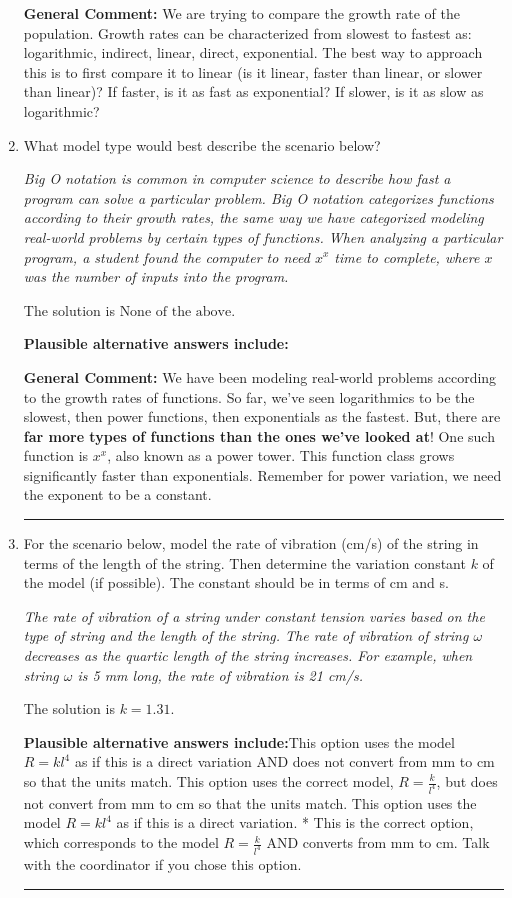 \documentclass{extbook}[14pt]
\newcommand{\litem}[1]{\item #1

\rule{\textwidth}{0.4pt}}
\begin{document}
\begin{enumerate}
{\textbf{General Comment:} We are trying to compare the growth rate of the population. Growth rates can be characterized from slowest to fastest as: logarithmic, indirect, linear, direct, exponential. The best way to approach this is to first compare it to linear (is it linear, faster than linear, or slower than linear)? If faster, is it as fast as exponential? If slower, is it as slow as logarithmic?
}
\litem{
What model type would best describe the scenario below?

\begin{center}
    \textit{ Big O notation is common in computer science to describe how fast a program can solve a particular problem. Big O notation categorizes functions according to their growth rates, the same way we have categorized modeling real-world problems by certain types of functions. When analyzing a particular program, a student found the computer to need $x^x$ time to complete, where $x$ was the number of inputs into the program. }
\end{center}
The solution is \( \text{None of the above} \).\begin{enumerate}[label=\Alph*.]
\textbf{Plausible alternative answers include:}



\end{enumerate}

\textbf{General Comment:} We have been modeling real-world problems according to the growth rates of functions. So far, we've seen logarithmics to be the slowest, then power functions, then exponentials as the fastest. But, there are \textbf{far more types of functions than the ones we've looked at}! One such function is $x^x$, also known as a power tower. This function class grows significantly faster than exponentials. Remember for power variation, we need the exponent to be a constant.
}
\litem{
For the scenario below, model the rate of vibration (cm/s) of the string in terms of the length of the string. Then determine the variation constant $k$ of the model (if possible). The constant should be in terms of cm and s.

\begin{center}
    \textit{ The rate of vibration of a string under constant tension varies based on the type of string and the length of the string. The rate of vibration of string $\omega$ decreases as the quartic length of the string increases. For example, when string $\omega$ is 5 mm long, the rate of vibration is 21 cm/s. }
\end{center}
The solution is \( k = 1.31 \).\begin{enumerate}[label=\Alph*.]
\textbf{Plausible alternative answers include:}This option uses the model $R = kl^{4}$ as if this is a direct variation AND does not convert from mm to cm so that the units match.
This option uses the correct model, $R = \frac{k}{l^{4}}$, but does not convert from mm to cm so that the units match.
This option uses the model $R = kl^{4}$ as if this is a direct variation.
* This is the correct option, which corresponds to the model $R = \frac{k}{l^{4}}$ AND converts from mm to cm.
Talk with the coordinator if you chose this option.
\end{enumerate}

}
\end{enumerate}
\end{document}
